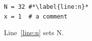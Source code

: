 \documentclass{article}
\begin{document}
\begin{lstlisting}
N = 32 #*\label{line:n}*
x = 1  # a comment
\end{lstlisting}
Line~\ref{line:n} sets N.
\end{document}
